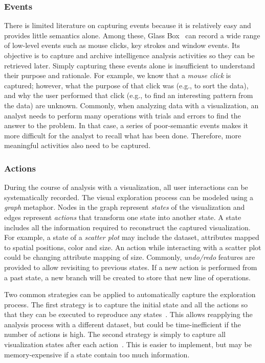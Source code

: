 \subsubsection{Events}
There is limited literature on capturing events because it is relatively easy and provides little semantics alone. Among these, Glass Box~\cite{Cowley2006} can record a wide range of low-level events such as mouse clicks, key strokes and window events. Its objective is to capture and archive intelligence analysis activities so they can be retrieved later. Simply capturing these events alone is insufficient to understand their purpose and rationale. For example, we know that a \textit{mouse click} is captured; however, what the purpose of that click was (e.g., to sort the data), and why the user performed that click (e.g., to find an interesting pattern from the data) are unknown. Commonly, when analyzing data with a visualization, an analyst needs to perform many operations with trials and errors to find the answer to the problem. In that case, a series of poor-semantic events makes it more difficult for the analyst to recall what has been done. Therefore, more meaningful activities also need to be captured. 

\subsubsection{Actions}
During the course of analysis with a visualization, all user interactions can be systematically recorded. The visual exploration process can be modeled using a \textit{graph} metaphor. Nodes in the graph represent \textit{states} of the visualization and edges represent \textit{actions} that transform one state into another state. A state includes all the information required to reconstruct the captured visualization. For example, a state of a \textit{scatter plot} may include the dataset, attributes mapped to spatial positions, color and size. An action while interacting with a scatter plot could be changing attribute mapping of size. Commonly, \emph{undo/redo} features are provided to allow revisiting to previous states. If a new action is performed from a past state, a new branch will be created to store that new line of operations. 

Two common strategies can be applied to automatically capture the exploration process. The first strategy is to capture the initial state and all the actions so that they can be executed to reproduce any states~\cite{Kadivar2009}. This allows reapplying the analysis process with a different dataset, but could be time-inefficient if the number of actions is high. The second strategy is simply to capture all visualization states after each action~\cite{Bavoil2005}. This is easier to implement, but may be memory-expensive if a state contain too much information.

